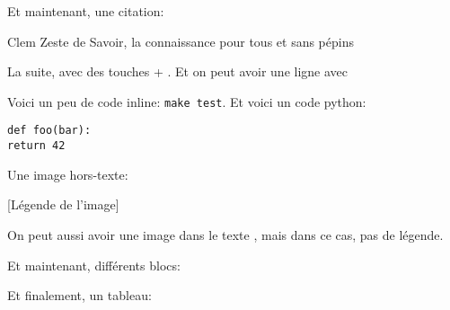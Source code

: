 \documentclass[small]{zmdocument}
\begin{document}
Et maintenant, une citation:

\begin{Quotation}{Clem}
Zeste de Savoir, la connaissance pour tous et sans pépins
\end{Quotation}

La suite, avec des touches  + . Et on peut avoir une ligne avec

\horizontalLine

Voici un peu de code inline: \verb`make test`. Et voici un code python:

\begin{verbatim}
def foo(bar):
return 42
\end{verbatim}

Une image hors-texte:

[Légende de l’image]

On peut aussi avoir une image dans le texte , mais dans ce cas, pas de légende.

Et maintenant, différents blocs:

\begin{Information}
\blindtext
\begin{Question}
\blindtext
\end{Question}
\end{Information}

\begin{Question}
\blindtext
\end{Question}

\begin{Warning}
\blindtext
\end{Warning}

\begin{Error}
\blindtext
\end{Error}

Et finalement, un tableau:
\end{document}
